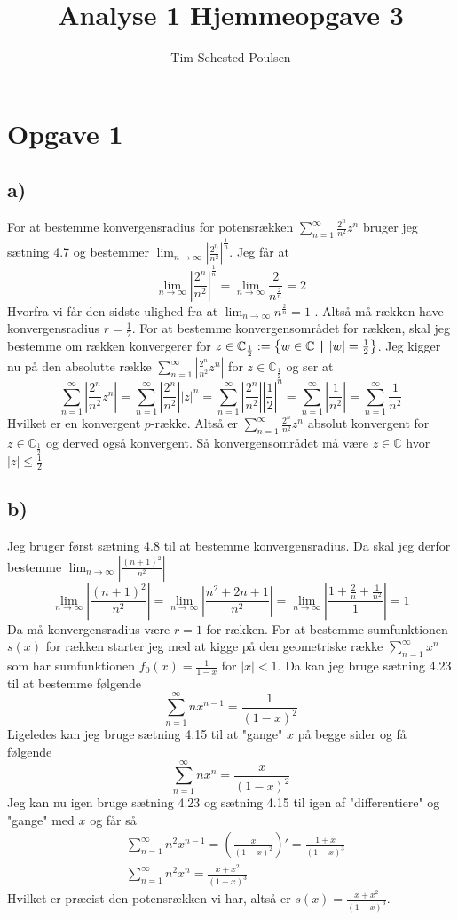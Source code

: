 \documentclass{article}
\title{Analyse 1 Hjemmeopgave 3}
\author{Tim Sehested Poulsen}
\newcommand{\m}[1]{\mathbb{#1}}
\newcommand{\mC}{\m{C}}
\newcommand{\lr}[1]{\left( #1\right)}
\newcommand{\set}[2]{\left\{ #1 \hspace{0.15cm} \textbf{\textbar}  \hspace{0.15cm} #2 \right\} }
\begin{document}
\section*{Opgave 1}
\subsection*{a)}
For at bestemme konvergensradius for potensrækken $\sum_{n=1}^{\infty} \frac{2^n}{n^2} z^n$ bruger jeg sætning 4.7 \cite{an1} og bestemmer
$\lim_{n \to \infty} |\frac{2^n}{n^2}|^{\frac{1}{n}}$. Jeg får at
\[
    \lim_{n \to \infty} |\frac{2^n}{n^2}|^{\frac{1}{n}}
    = \lim_{n \to \infty} \frac{2}{n^{\frac{2}{n}}}
    = 2
\]
Hvorfra vi får den sidste ulighed fra at $\lim_{n \to \infty} n^{\frac{2}{n}} = 1$ \cite[Eks. ]{an1}
.
Altså må rækken have konvergensradius $r=\frac{1}{2}$.
For at bestemme konvergensområdet for rækken, skal jeg bestemme om rækken konvergerer for $z \in \mC_{\frac{1}{2}} := \set{w \in \mC}{|w|=\frac{1}{2}}$.
Jeg kigger nu på den absolutte række $\sum_{n=1}^{\infty} | \frac{2^n}{n^2} z^n|$ for $z \in \mC_{\frac{1}{2}}$ og ser at
\[
    \sum_{n=1}^{\infty} | \frac{2^n}{n^2} z^n|
    = \sum_{n=1}^{\infty} | \frac{2^n}{n^2}| |z|^n
    = \sum_{n=1}^{\infty} | \frac{2^n}{n^2}| |\frac{1}{2}|^n
    = \sum_{n=1}^{\infty} | \frac{1}{n^2}|
    = \sum_{n=1}^{\infty} \frac{1}{n^2}
\]
Hvilket er en konvergent $p$-række. Altså er $\sum_{n=1}^{\infty} \frac{2^n}{n^2} z^n$ absolut konvergent
for $z \in \mC_{\frac{1}{2}}$ og derved også konvergent.
Så konvergensområdet må være $z \in \mC$ hvor $|z| \le \frac{1}{2}$

\subsection*{b)}
Jeg bruger først sætning 4.8 \cite{an1} til at bestemme konvergensradius. Da skal
jeg derfor bestemme $\lim_{n \to \infty} |\frac{(n+1)^2}{n^2}|$
\[
    \lim_{n \to \infty} |\frac{(n+1)^2}{n^2}|
    = \lim_{n \to \infty} |\frac{n^2 +2n + 1}{n^2}|
    = \lim_{n \to \infty} |\frac{1 +\frac{2}{n} + \frac{1}{n^2}}{1}|
    = 1 
\]
Da må konvergensradius være $r=1$ for rækken. For at bestemme sumfunktionen $s(x)$ for rækken
starter jeg med at kigge på den geometriske række $\sum_{n=1}^{\infty} x^n$  
som har sumfunktionen $f_0(x) = \frac{1}{1-x}$ for $|x| < 1$.
Da kan jeg bruge sætning 4.23 \cite{an1} til at bestemme følgende 
\[
    \sum_{n=1}^{\infty} n x^{n-1} = \frac{1}{(1-x)^2}
\]
Ligeledes kan jeg bruge sætning 4.15 \cite{an1} til at "gange" $x$ på begge sider
og få følgende
\[
    \sum_{n=1}^{\infty} n x^{n} = \frac{x}{(1-x)^2}
\]
Jeg kan nu igen bruge sætning 4.23 og sætning 4.15 \cite{an1} til igen af "differentiere" og "gange" med $x$ og får så
\begin{align*}
    &\sum_{n=1}^{\infty} n^2 x^{n-1} = \lr{\frac{x}{(1-x)^2}}' = \frac{1+x}{(1-x)^3} \\
    &\sum_{n=1}^{\infty} n^2 x^{n} = \frac{x+x^2}{(1-x)^3}
\end{align*}
Hvilket er præcist den potensrækken vi har, altså er $s(x) = \frac{x+x^2}{(1-x)^3}$.
\end{document}
